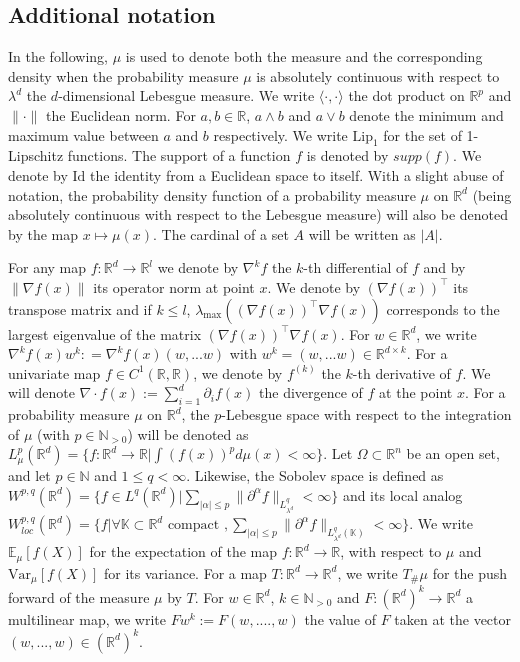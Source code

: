 \documentclass{article}
\begin{document}
\subsection{Additional notation}
In the following, $\mu$ is used
to denote
both the measure and the corresponding density when the probability measure $\mu$ is absolutely continuous with respect to $\lambda^d$ the $d$-dimensional Lebesgue measure. We write $\langle \cdot, \cdot \rangle$ the dot product on $\mathbb{R}^p$ and $\|\cdot\|$ the Euclidean norm. For $a,b\in \mathbb{R}$, $a\wedge b$ and $a\vee b$ denote the minimum and maximum value between $a$ and $b$ respectively. We write $\text{Lip}_1$ for the set of 1-Lipschitz functions. The support of a function $f$ is denoted by $supp(f)$. We  denote by $\text{Id}$ the identity from a Euclidean space to itself. With a slight abuse of notation, the probability density function of a probability measure $\mu$ on $\mathbb{R}^d$ (being absolutely continuous with respect to the Lebesgue measure) will also be denoted by  the map $x\mapsto \mu(x)$. The cardinal of a set $A$ will be written as $|A|$.

For any map $f:\mathbb{R}^d\rightarrow \mathbb{R}^l$ we denote by $\nabla^k f$ the $k$-th differential of $f$ and by $\|\nabla f(x)\|$ its operator norm at point $x$. We denote by $(\nabla f(x))^\top$ its transpose matrix and if $k\leq l$, $\lambda_{\max}((\nabla f(x) )^\top \nabla f(x))$ corresponds to the largest eigenvalue of the matrix $(\nabla f(x) )^\top \nabla f(x)$. For $w\in \mathbb{R}^d$, we write $\nabla^k f(x) w^k: = \nabla^k f(x) (w,...w)$  with $w^k=(w,...w) \in \mathbb{R}^{d\times k}$. For a univariate map $f\in C^1(\mathbb{R},\mathbb{R})$, we denote by $f^{(k)}$ the $k$-th derivative of $f$. We will denote $\nabla \cdot f(x):= \sum_{i=1}^d \partial_i f(x)$ the divergence of $f$ at the point $x$. For a probability measure $\mu$ on $\mathbb{R}^d$, the $p$-Lebesgue space with respect to the integration of $\mu$ (with $p\in \mathbb{N}_{>0}$) will be denoted as $L^p_\mu(\mathbb{R}^d)=\{f:\mathbb{R}^d\rightarrow \mathbb{R}| \int (f(x))^p d\mu(x)<\infty\}$. Let $\Omega \subset \mathbb{R}^n$ be an open set, and let $p \in \mathbb{N}$ and $1 \leq q < \infty$. Likewise, the Sobolev 
 space is defined as $
W^{p,q}(\mathbb{R}^d) = \{ f \in L^q(\mathbb{R}^d) |\sum_{|\alpha|\leq p} \|\partial^\alpha f\|_{L^q_{\lambda^d}} <\infty\}
$ and its local analog $
W^{p,q}_{loc}(\mathbb{R}^d) = \{ f |\forall \mathbb{K}\subset \mathbb{R}^d \text{ compact },\sum_{|\alpha|\leq p} \|\partial^\alpha f\|_{L^q_{\lambda^d}(\mathbb{K})} <\infty\}
$. We write $\mathbb{E}_\mu[f(X)]$ for the expectation of 
the map $f:\mathbb{R}^d\rightarrow \mathbb{R}$, with respect to $\mu$ and $\text{Var}_\mu[f(X)]$ for its variance. For a map $T:\mathbb{R}^d\rightarrow \mathbb{R}^d$, we write $T_{\# }\mu$ for the push forward of the measure $\mu$ by $T$. For $w\in \mathbb{R}^d$, $k\in \mathbb{N}_{>0}$ and $F:\left(\mathbb{R}^d\right)^k\rightarrow \mathbb{R}^d$ a multilinear map, we write $Fw^k:=F(w,....,w)$ the value of $F$ taken at the vector $(w,...,w)\in \left(\mathbb{R}^d\right)^k$.
\end{document}
